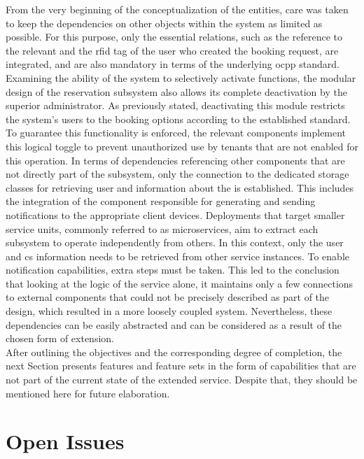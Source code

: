From the very beginning of the conceptualization of the entities, care was taken to keep the dependencies on other objects within the system as limited as possible. For this purpose, only the essential relations, such as the reference to the relevant  and the \acrshort{rfid} tag of the user who created the booking request, are integrated, and are also mandatory in terms of the underlying \acrshort{ocpp} standard.
Examining the ability of the system to selectively activate functions, the modular design of the reservation subsystem also allows its complete deactivation by the superior administrator. As previously stated, deactivating this module restricts the system's users to the booking options according to the established standard.
To guarantee this functionality is enforced, the relevant components implement this logical toggle to prevent unauthorized use by tenants that are not enabled for this operation.
In terms of dependencies referencing other components that are not directly part of the subsystem, only the connection to the dedicated storage classes for retrieving user and information about the  is established. This includes the integration of the component responsible for generating and sending notifications to the appropriate client devices.
Deployments that target smaller service units, commonly referred to as microservices, aim to extract each subsystem to operate independently from others. In this context, only the user and \acrshort{cs} information needs to be retrieved from other service instances. To enable notification capabilities, extra steps must be taken. 
This led to the conclusion that looking at the logic of the service alone, it maintains only a few connections to external components that could not be precisely described as part of the design, which resulted in a more loosely coupled system. Nevertheless, these dependencies can be easily abstracted and can be considered as a result of the chosen form of extension. \\

\noindent After outlining the objectives and the corresponding degree of completion, the next Section presents features and feature sets in the form of capabilities that are not part of the current state of the extended service. Despite that, they should be mentioned here for future elaboration.

\section{Open Issues}
\label{ch:Analysis and Validation:sec:Open Issues}

